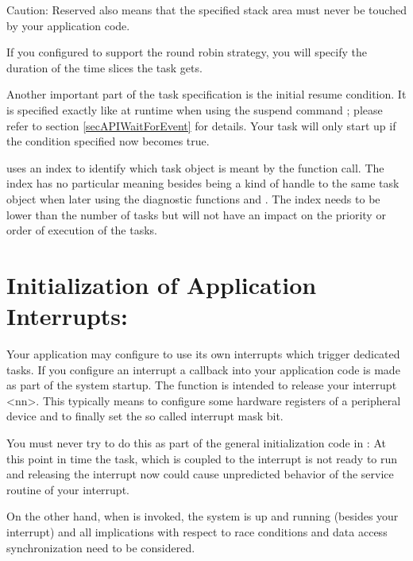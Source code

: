 Caution: Reserved also means that the specified stack area must never be
touched by your application code.

If you configured \rtos{} to support the round robin strategy, you will
specify the duration of the time slices the task gets.

Another important part of the task specification is the initial resume
condition. It is specified exactly like at runtime when using the suspend
command ; please refer to section
\ref{secAPIWaitForEvent} for details. Your task will only start up if the
condition specified now becomes true.

 uses an index to identify which task object is
meant by the function call. The index has no particular meaning besides
being a kind of handle to the same task object when later using the
diagnostic functions  and
. The index needs to be lower than the number
of tasks but will not have an impact on the priority or order of execution
of the tasks.


\section{Initialization of Application Interrupts:
}

Your application may configure \rtos{} to use its own interrupts which
trigger dedicated tasks. If you configure an interrupt a callback into
your application code is made as part of the system startup. The function
 is intended to
release your interrupt \textless nn\textgreater. This
typically means to configure some hardware registers of a peripheral
device and to finally set the so called interrupt mask bit.

You must never try to do this as part of the general initialization code
in : At this point in time the task, which is coupled to the
interrupt is not ready to run and releasing the interrupt now could cause
unpredicted behavior of the service routine of your interrupt.

On the other hand, when  is invoked, the \rtos{} system is up and running (besides
your interrupt) and all implications with respect to race conditions and
data access synchronization need to be considered.

